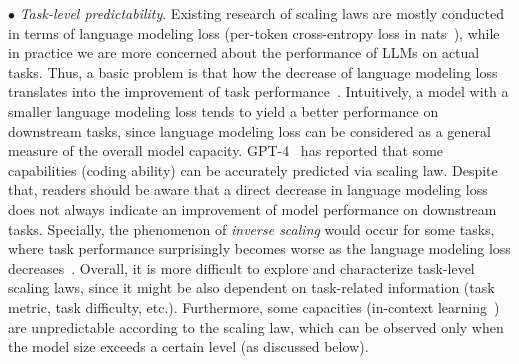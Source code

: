 {
$\bullet$ \emph{Task-level  predictability}.  
Existing research of scaling laws are mostly conducted in terms of language modeling loss (\eg per-token cross-entropy loss in nats~\cite{Kaplan-arxiv-2020-Scaling}), while in practice we are more concerned about the performance of LLMs on actual tasks. 
Thus, a basic problem is that how the decrease of language modeling loss translates into the improvement of task performance~\cite{Henighan-2020-scalinglaw}. 
Intuitively, a model with a smaller language modeling  loss tends to yield a better performance on downstream tasks, since language modeling loss can be considered as a general measure of the overall model capacity. 
 GPT-4~\cite{OpenAI-OpenAI-2023-GPT-4} has reported that some capabilities (\eg coding ability) can be accurately predicted via scaling law.  Despite that, 
readers should be aware that a direct decrease in language modeling loss does not always indicate an improvement of model performance on downstream  tasks. Specially, the phenomenon of \emph{inverse scaling} would occur for some  tasks, where task performance surprisingly  becomes worse as the language modeling loss decreases~\cite{McKenzie-2022-inverse}.  Overall, it is more difficult to explore and characterize task-level scaling laws, since it might be also dependent on task-related information (task metric, task difficulty, etc.). Furthermore, some capacities (\eg in-context learning~\cite{Brown-NeurIPS-2020-Language}) are unpredictable according to the scaling law, which can be observed only when the model size exceeds a certain level (as discussed below).  }

%













